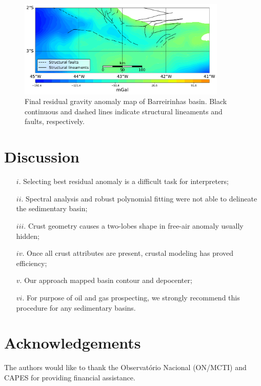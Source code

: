 \documentclass{sciposter}
\begin{document}
\begin{multicols}{3}
	\begin{figure}
		\begin{center}
		\includegraphics[width=0.885\textwidth]{figures/gemma01-residual(3).pdf}
		\end{center}
		\caption{Final residual gravity anomaly map of Barreirinhas basin. Black continuous and dashed lines indicate structural lineaments and faults, respectively.}
		\label{fig6}
	\end{figure}
		
	\section*{\large Discussion}
	\begin{itemize}
		\item[$i.$] Selecting best residual anomaly is a difficult task for interpreters;
		\item[$ii.$] Spectral analysis and robust polynomial fitting were not able to delineate the sedimentary basin;
		\item[$iii.$] Crust geometry causes a two-lobes shape in free-air anomaly usually hidden;
		\item[$iv.$] Once all crust attributes are present, crustal modeling has proved efficiency;
		\item[$v.$] Our approach mapped basin contour and depocenter;
		\item[$vi.$] For purpose of oil and gas prospecting, we strongly recommend this procedure for any sedimentary basins.
	\end{itemize}
	
	\section*{\large Acknowledgements}
	The authors would like to thank the Observatório Nacional (ON/MCTI) and CAPES for providing financial assistance.
	
	
	
	\end{multicols}
\end{document}
